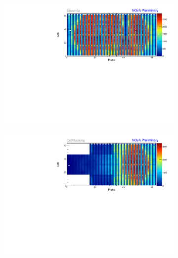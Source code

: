 \begin{figure}[!hbtp]
\centering
\begin{subfigure}[b]{\textwidth}
\centering
\includegraphics[width=\textwidth]{Plots/TBCalibration/Attenprofs_P4Data_CellPlane_Epoch4a.pdf}
\end{subfigure}
\begin{subfigure}[b]{\textwidth}
\centering
\includegraphics[width=\textwidth]{Plots/TBCalibration/Attenprofs_P4Data_CellPlane_CellMasking.pdf}
\end{subfigure}
\begin{subfigure}[b]{\textwidth}
\centering

\end{subfigure}
\end{figure}
